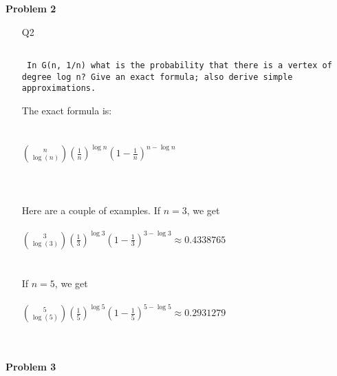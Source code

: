 \documentclass[ruled]{article}
\begin{document}
\textbf{Problem 2}
\begin{itemize}
\item[Q2]
\begin{verbatim}

 In G(n, 1/n) what is the probability that there is a vertex of
degree log n? Give an exact formula; also derive simple approximations.

\end{verbatim}
The exact formula is: \\\\ \\ 
{\LARGE $ { n \choose \log(n)} (\frac{1}{n})^ {\log n} (1 - \frac{1}{n})^{n - \log n}$}
\\ \\ \\ \\ 

Here are a couple of examples.  If $n = 3$, we get 
\\ \\
{\LARGE $ { 3 \choose \log(3)} (\frac{1}{3})^ {\log 3} (1 - \frac{1}{3})^{3 - \log 3} \approx 0.4338765$}
\\ \\ \\
If $n = 5$, we get
\\ \\
{\LARGE $ { 5 \choose \log(5)} (\frac{1}{5})^ {\log 5} (1 - \frac{1}{5})^{5 - \log 5} \approx 0.2931279$} \\ \\ \\



\end{itemize}
\newpage
\textbf{Problem 3}
\end{document}
